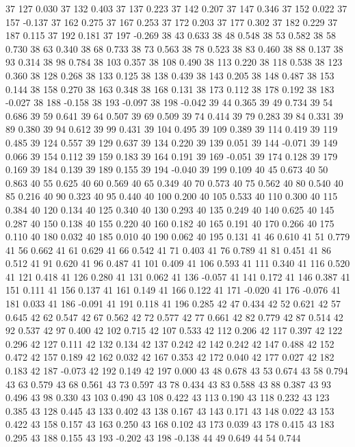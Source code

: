 37 127 0.030
37 132 0.403
37 137 0.223
37 142 0.207
37 147 0.346
37 152 0.022
37 157 -0.137
37 162 0.275
37 167 0.253
37 172 0.203
37 177 0.302
37 182 0.229
37 187 0.115
37 192 0.181
37 197 -0.269
38 43 0.633
38 48 0.548
38 53 0.582
38 58 0.730
38 63 0.340
38 68 0.733
38 73 0.563
38 78 0.523
38 83 0.460
38 88 0.137
38 93 0.314
38 98 0.784
38 103 0.357
38 108 0.490
38 113 0.220
38 118 0.538
38 123 0.360
38 128 0.268
38 133 0.125
38 138 0.439
38 143 0.205
38 148 0.487
38 153 0.144
38 158 0.270
38 163 0.348
38 168 0.131
38 173 0.112
38 178 0.192
38 183 -0.027
38 188 -0.158
38 193 -0.097
38 198 -0.042
39 44 0.365
39 49 0.734
39 54 0.686
39 59 0.641
39 64 0.507
39 69 0.509
39 74 0.414
39 79 0.283
39 84 0.331
39 89 0.380
39 94 0.612
39 99 0.431
39 104 0.495
39 109 0.389
39 114 0.419
39 119 0.485
39 124 0.557
39 129 0.637
39 134 0.220
39 139 0.051
39 144 -0.071
39 149 0.066
39 154 0.112
39 159 0.183
39 164 0.191
39 169 -0.051
39 174 0.128
39 179 0.169
39 184 0.139
39 189 0.155
39 194 -0.040
39 199 0.109
40 45 0.673
40 50 0.863
40 55 0.625
40 60 0.569
40 65 0.349
40 70 0.573
40 75 0.562
40 80 0.540
40 85 0.216
40 90 0.323
40 95 0.440
40 100 0.200
40 105 0.533
40 110 0.300
40 115 0.384
40 120 0.134
40 125 0.340
40 130 0.293
40 135 0.249
40 140 0.625
40 145 0.287
40 150 0.138
40 155 0.220
40 160 0.182
40 165 0.191
40 170 0.266
40 175 0.110
40 180 0.032
40 185 0.010
40 190 0.062
40 195 0.131
41 46 0.610
41 51 0.779
41 56 0.662
41 61 0.629
41 66 0.542
41 71 0.403
41 76 0.789
41 81 0.451
41 86 0.512
41 91 0.620
41 96 0.487
41 101 0.409
41 106 0.593
41 111 0.340
41 116 0.520
41 121 0.418
41 126 0.280
41 131 0.062
41 136 -0.057
41 141 0.172
41 146 0.387
41 151 0.111
41 156 0.137
41 161 0.149
41 166 0.122
41 171 -0.020
41 176 -0.076
41 181 0.033
41 186 -0.091
41 191 0.118
41 196 0.285
42 47 0.434
42 52 0.621
42 57 0.645
42 62 0.547
42 67 0.562
42 72 0.577
42 77 0.661
42 82 0.779
42 87 0.514
42 92 0.537
42 97 0.400
42 102 0.715
42 107 0.533
42 112 0.206
42 117 0.397
42 122 0.296
42 127 0.111
42 132 0.134
42 137 0.242
42 142 0.242
42 147 0.488
42 152 0.472
42 157 0.189
42 162 0.032
42 167 0.353
42 172 0.040
42 177 0.027
42 182 0.183
42 187 -0.073
42 192 0.149
42 197 0.000
43 48 0.678
43 53 0.674
43 58 0.794
43 63 0.579
43 68 0.561
43 73 0.597
43 78 0.434
43 83 0.588
43 88 0.387
43 93 0.496
43 98 0.330
43 103 0.490
43 108 0.422
43 113 0.190
43 118 0.232
43 123 0.385
43 128 0.445
43 133 0.402
43 138 0.167
43 143 0.171
43 148 0.022
43 153 0.422
43 158 0.157
43 163 0.250
43 168 0.102
43 173 0.039
43 178 0.415
43 183 0.295
43 188 0.155
43 193 -0.202
43 198 -0.138
44 49 0.649
44 54 0.744
